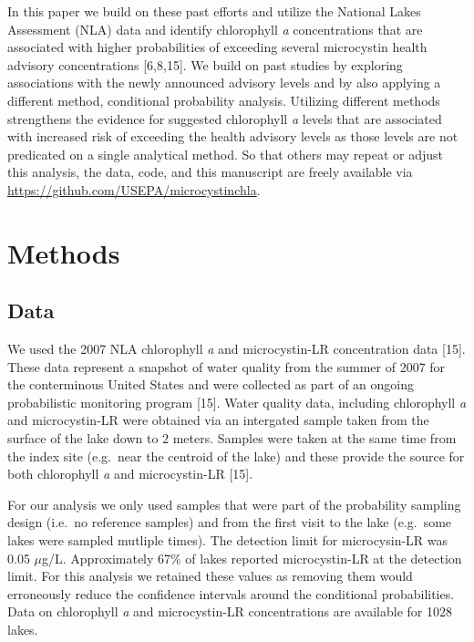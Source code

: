 \documentclass[11pt,]{article}
\begin{document}
In this paper we build on these past efforts and utilize the National
Lakes Assessment (NLA) data and identify chlorophyll \emph{a}
concentrations that are associated with higher probabilities of
exceeding several microcystin health advisory concentrations
{[}6,8,15{]}. We build on past studies by exploring associations with
the newly announced advisory levels and by also applying a different
method, conditional probability analysis. Utilizing different methods
strengthens the evidence for suggested chlorophyll \emph{a} levels that
are associated with increased risk of exceeding the health advisory
levels as those levels are not predicated on a single analytical method.
So that others may repeat or adjust this analysis, the data, code, and
this manuscript are freely available via
\href{https://github.com/USAPE/microcystinchla}{https://github.com/USEPA/microcystinchla}.

\section{Methods}\label{methods}

\subsection{Data}\label{data}

We used the 2007 NLA chlorophyll \emph{a} and microcystin-LR
concentration data {[}15{]}. These data represent a snapshot of water
quality from the summer of 2007 for the conterminous United States and
were collected as part of an ongoing probabilistic monitoring program
{[}15{]}. Water quality data, including chlorophyll \emph{a} and
microcystin-LR were obtained via an intergated sample taken from the
surface of the lake down to 2 meters. Samples were taken at the same
time from the index site (e.g.~near the centroid of the lake) and these
provide the source for both chlorophyll \emph{a} and microcystin-LR
{[}15{]}.

For our analysis we only used samples that were part of the probability
sampling design (i.e.~no reference samples) and from the first visit to
the lake (e.g.~some lakes were sampled mutliple times). The detection
limit for microcysin-LR was 0.05 \(\mu\)g/L. Approximately 67\% of lakes
reported microcystin-LR at the detection limit. For this analysis we
retained these values as removing them would erroneously reduce the
confidence intervals around the conditional probabilities. Data on
chlorophyll \emph{a} and microcystin-LR concentrations are available for
1028 lakes.
\end{document}
